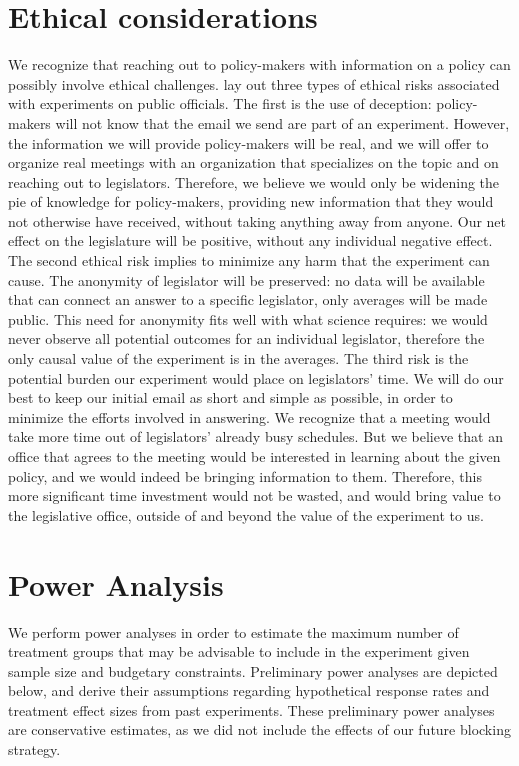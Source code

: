\documentclass[12pt,final,fleqn]{article}
\theoremstyle{plain}
\begin{document}
\section{Ethical considerations} \label{sec:Ethics}
We recognize that reaching out to policy-makers with information on a policy can possibly involve ethical challenges. \citet{butler2011politicians} lay out three types of ethical risks associated with experiments on public officials. The first is the use of deception: policy-makers will not know that the email we send are part of an experiment. However, the information we will provide policy-makers will be real, and we will offer to organize real meetings with an organization that specializes on the topic and on reaching out to legislators. Therefore, we believe we would only be widening the pie of knowledge for policy-makers, providing new information that they would not otherwise have received, without taking anything away from anyone. Our net effect on the legislature will be positive, without any individual negative effect. The second ethical risk implies to minimize any harm that the experiment can cause. The anonymity of legislator will be preserved: no data will be available that can connect an answer to a specific legislator, only averages will be made public. This need for anonymity fits well with what science requires: we would never observe all potential outcomes for an individual legislator, therefore the only causal value of the experiment is in the averages. The third risk is the potential burden our experiment would place on legislators' time. We will do our best to keep our initial email as short and simple as possible, in order to minimize the efforts involved in answering. We recognize that a meeting would take more time out of legislators' already busy schedules. But we believe that an office that agrees to the meeting would be interested in learning about the given policy, and we would indeed be bringing information to them. Therefore, this more significant time investment would not be wasted, and would bring value to the legislative office, outside of and beyond the value of the experiment to us. 




\section{Power Analysis} \label{sec:Power}

We perform power analyses in order to estimate the maximum number of treatment groups that may be advisable to include in the experiment given sample size and budgetary constraints. Preliminary power analyses are depicted below, and derive their assumptions regarding hypothetical response rates and treatment effect sizes from past experiments. These preliminary power analyses are conservative estimates, as we did not include the effects of our future blocking strategy.
\end{document}
